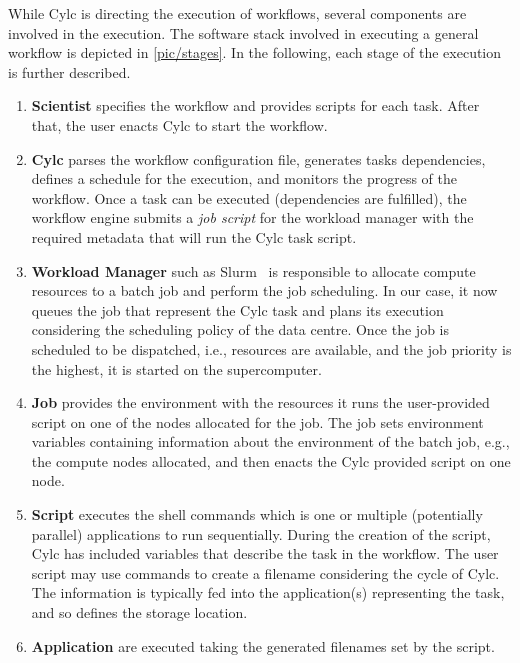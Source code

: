 \documentclass{superfri}
\begin{document}
While Cylc is directing the execution of workflows, several components are involved in the execution.
The software stack involved in executing a general workflow is depicted in \cref{pic/stages}.
In the following, each stage of the execution is further described.


\begin{enumerate}

  \item \textbf{Scientist} specifies the workflow and provides scripts for each task.
  After that, the user enacts Cylc to start the workflow.

  \item \textbf{Cylc} parses the workflow configuration file, generates tasks dependencies, defines a schedule for the execution, and monitors the progress of the workflow.
  Once a task can be executed (dependencies are fulfilled), the workflow engine submits a \textit{job script} for the workload manager with the required metadata that will run the Cylc task script.

  \item \textbf{Workload Manager} such as Slurm~\cite{Jette02slurm:simple} is responsible to allocate compute resources to a batch job and perform the job scheduling.
  In our case, it now queues the job that represent the Cylc task and plans its execution considering the scheduling policy of the data centre.
  Once the job is scheduled to be dispatched, i.e., resources are available, and the job priority is the highest, it is started on the supercomputer.

  \item \textbf{Job} provides the environment with the resources it runs the user-provided script on one of the nodes allocated for the job.
  The job sets environment variables containing information about the environment of the batch job, e.g., the compute nodes allocated, and then enacts the Cylc provided script on one node.

  \item \textbf{Script} executes the shell commands which is one or multiple (potentially parallel) applications to run sequentially.
  During the creation of the script, Cylc has included variables that describe the task in the workflow.
  The user script may use commands to create a filename considering the cycle of Cylc.
  The information is typically fed into the application(s) representing the task, and so defines the storage location.

  \item \textbf{Application} are executed taking the generated filenames set by the script.
\end{enumerate}
\end{document}
